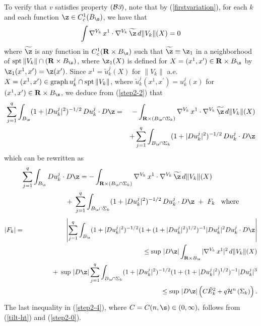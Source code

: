\documentclass[a4paper,11pt]{amsart}
\begin{document}
To verify that $v$ satisfies property $({\mathcal B{\emph 3}})$, note that by (\ref{firstvariation}), for each $k$ and each function $\z \in C^{1}_{c}(B_{\s})$, we have that 
\begin{equation}\label{step2-2}
\int \nabla^{V_{k}} \, x^{1} \cdot \nabla^{V_{k}} \, {\widetilde \z} \,d\|V_{k}\|(X) = 0
\end{equation}
where ${\widetilde \z}$ is any function in  $C^{1}_{c}({\mathbf R} \times B_{\s})$ such that 
${\widetilde \z} \equiv \z_{1}$ in a neighborhood of ${\rm spt} \, \|V_{k}\| \cap ({\mathbf R} \times B_{\s})$, where $\z_{1}(X)$ is defined for $X = (x^{1}, x^{\prime}) \in {\mathbf R} \times B_{\s}$ by 
$\z_{1}(x^{1}, x^{\prime}) = \z(x^{\prime})$.  Since $x^{1} = {\widetilde u}_{k}^{j}(X)$ 
for $\|V_{k}\|$ a.e. $X = (x^{1}, x^{\prime}) \in {\rm graph} \, u_{k}^{j} \cap {\rm spt} \, \|V_{k}\|$, 
where ${\widetilde u}_{k}^{j}(x^{1}, x^{\prime}) = u_{k}^{j}(x)$ for $(x^{1}, x^{\prime}) \in {\mathbf R} \times B_{\s}$, we deduce from (\ref{step2-2}) that 
\begin{eqnarray*}
\sum_{j=1}^{q}\int_{B_{\s}}(1 + |Du_{k}^{j}|^{2})^{-1/2} \, Du_{k}^{j} \cdot D\z &=& 
-\int_{{\mathbf R} \times (B_{\s} \cap \Sigma_{k})} \nabla^{V_{k}} \, x^{1} \cdot \nabla^{V_{k}} \, 
{\widetilde \z} \, d\|V_{k}\|(X)\nonumber\\ 
&&+ \sum_{j=1}^{q}\int_{B_{\s} \cap \Sigma_{k}} (1 + |Du_{k}^{j}|^{2})^{-1/2} \, Du_{k}^{j} \cdot D\z 
\end{eqnarray*}
which can be rewritten as 
\begin{eqnarray}\label{step2-3}
\sum_{j=1}^{q}\int_{B_{\s}}Du_{k}^{j} \cdot D\z =-\int_{{\mathbf R} \times (B_{\s} \cap \Sigma_{k})} \nabla^{V_{k}} \, x^{1} \cdot \nabla^{V_{k}} \, 
{\widetilde \z} \, d\|V_{k}\|(X)&&\nonumber\\ 
&&\hspace{-3in}+ \; \sum_{j=1}^{q}\int_{B_{\s} \cap \Sigma_{k}} (1 + |Du_{k}^{j}|^{2})^{-1/2} \, Du_{k}^{j} \cdot D\z \; + \; F_{k} \;\;\; {\rm where}
\end{eqnarray}
\begin{eqnarray}\label{step2-4}
|F_{k}| &=& \left|\sum_{j=1}^{q}\int_{B_{\s}} (1 +|Du_{k}^{j}|^{2})^{-1/2}(1 + (1 + |Du_{k}^{j}|^{2})^{1/2})^{-1}|Du_{k}^{j}|^{2} Du_{k}^{j} \cdot D\z\right|\nonumber\\
&&\leq \sup \, |D\z|\int_{{\mathbf R} \times B_{\s}} |\nabla^{V_{k}} \, x^{1}|^{2} \, d\|V_{k}\|(X)\nonumber\\ 
&&\hspace{.5in}+ \; \sup \, |D\z|\sum_{j=1}^{q}\int_{B_{\s} \cap \Sigma_{k}} (1 +|Du_{k}^{j}|^{2})^{-1/2}(1 + (1 + |Du_{k}^{j}|^{2})^{1/2})^{-1}|Du_{k}^{j}|^{3}\nonumber\\
&&\leq \sup \, |D\z| \left(C{\hat E}_{k}^{2} + q{\mathcal H}^{n} \, (\Sigma_{k})\right).
\end{eqnarray}
The last inequality in (\ref{step2-4}),  where $C = C(n, \s) \in (0, \infty),$ follows from (\ref{tilt-ht}) and 
(\ref{step2-0}).
\end{document}
